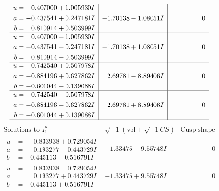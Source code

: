 \documentclass[1p]{elsarticle_modified}
\theoremstyle{definition}
\newcommand{\I}{\sqrt{-1}}
\begin{document}
$$\begin{array}{c|c|c}
\begin{aligned}
u &= \phantom{-}0.407000 + 1.005930 I \\
a &= -0.437541 + 0.247181 I \\
b &= \phantom{-}0.810914 + 0.503999 I\end{aligned}
 & -1.70138 - 1.08051 I & \phantom{-0.000000 } 0 \\ \hline\begin{aligned}
u &= \phantom{-}0.407000 - 1.005930 I \\
a &= -0.437541 - 0.247181 I \\
b &= \phantom{-}0.810914 - 0.503999 I\end{aligned}
 & -1.70138 + 1.08051 I & \phantom{-0.000000 } 0 \\ \hline\begin{aligned}
u &= -0.742540 + 0.507978 I \\
a &= -0.884196 + 0.627862 I \\
b &= -0.601044 - 0.139088 I\end{aligned}
 & \phantom{-}2.69781 - 8.89406 I & \phantom{-0.000000 } 0 \\ \hline\begin{aligned}
u &= -0.742540 - 0.507978 I \\
a &= -0.884196 - 0.627862 I \\
b &= -0.601044 + 0.139088 I\end{aligned}
 & \phantom{-}2.69781 + 8.89406 I & \phantom{-0.000000 } 0\\
 \hline 
 \end{array}$$\newpage$$\begin{array}{c|c|c}  
\text{Solutions to }I^u_{1}& \I (\text{vol} + \sqrt{-1}CS) & \text{Cusp shape}\\
 \hline 
\begin{aligned}
u &= \phantom{-}0.833938 + 0.729054 I \\
a &= \phantom{-}0.193277 - 0.443729 I \\
b &= -0.445113 - 0.516791 I\end{aligned}
 & -1.33475 - 9.55748 I & \phantom{-0.000000 } 0 \\ \hline\begin{aligned}
u &= \phantom{-}0.833938 - 0.729054 I \\
a &= \phantom{-}0.193277 + 0.443729 I \\
b &= -0.445113 + 0.516791 I\end{aligned}
 & -1.33475 + 9.55748 I & \phantom{-0.000000 } 0 \\ \hline\begin{aligned}

\end{aligned}
\end{array}$$
\end{document}
